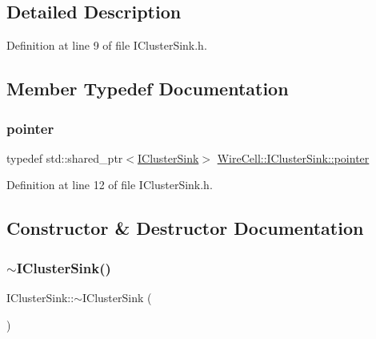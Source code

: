 \subsection{Detailed Description}


Definition at line 9 of file I\+Cluster\+Sink.\+h.



\subsection{Member Typedef Documentation}
\mbox{\label{class_wire_cell_1_1_i_cluster_sink_a8deee27cc959db3713d08b3d8e1403b1}} 
\subsubsection{\texorpdfstring{pointer}{pointer}}
{\footnotesize\ttfamily typedef std\+::shared\+\_\+ptr$<$\hyperlink{class_wire_cell_1_1_i_cluster_sink}{I\+Cluster\+Sink}$>$ \hyperlink{class_wire_cell_1_1_i_cluster_sink_a8deee27cc959db3713d08b3d8e1403b1}{Wire\+Cell\+::\+I\+Cluster\+Sink\+::pointer}}



Definition at line 12 of file I\+Cluster\+Sink.\+h.



\subsection{Constructor \& Destructor Documentation}
\mbox{\label{class_wire_cell_1_1_i_cluster_sink_ab3a9af3c498ce3b908070a84e021aa5b}} 
\subsubsection{\texorpdfstring{$\sim$\+I\+Cluster\+Sink()}{~IClusterSink()}}
{\footnotesize\ttfamily I\+Cluster\+Sink\+::$\sim$\+I\+Cluster\+Sink (\begin{DoxyParamCaption}{ }\end{DoxyParamCaption})\hspace{0.3cm}{\ttfamily [virtual]}}



